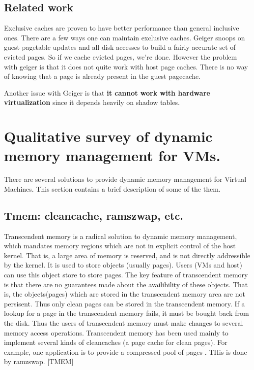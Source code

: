 \documentclass[10pt,a4paper]{article}
\begin{document}
\subsection{Related work}

Exclusive caches are proven to have better performance than  general inclusive ones. There are a few ways one can maintain exclusive caches. 
Geiger snoops on guest pagetable updates  and all disk accesses to build a  fairly accurate set of evicted pages. So if we cache evicted pages, we're done. However the problem with geiger is that it does not quite work with host page caches. There is no way of knowing that a page is already present in the guest pagecache. 

Another issue with Geiger is that \textbf{it cannot work with hardware virtualization} since it depends heavily on shadow tables. 


\section{Qualitative survey of dynamic memory management for VMs.}

There are several solutions to provide dynamic memory management for Virtual Machines. This section contains a brief description of some of the them. 

\subsection{Tmem: cleancache, ramszwap, etc.}
Transcendent memory is a radical solution to dynamic memory management, which mandates memory regions which are not in explicit control of the host kernel. That is, a large area of memory is reserved, and is not directly addressible by the kernel. It is used to store objects (usually pages). Users (VMs and host) can use this object store to store pages. The key feature of transcendent memory is that there are no guarantees made about the availibility of these objects. That is, the objects(pages) which are stored in the transcendent memory area are not persisent. Thus only clean pages can be stored in the transcendent memory. 
If a lookup for a page in the transcendent memory fails, it must be bought back from the disk. Thus the users of transcendent memory must make changes to several memory access operations. 
Transcendent memory has been used mainly to implement several kinds of cleancaches (a page cache for clean pages). For example, one application is to provide a compressed pool of pages . THis is done by ramzswap. 
[TMEM]
\end{document}
